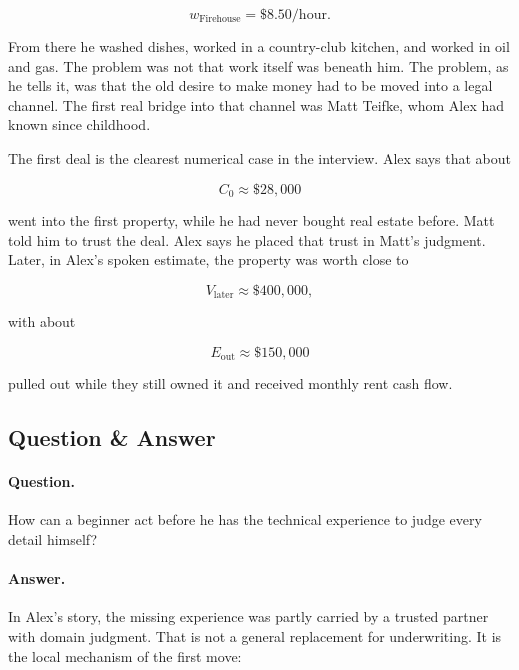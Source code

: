 \documentclass[11pt,oneside]{book}
\begin{document}
\begin{equation}
w_{\text{Firehouse}}=\$8.50/\text{hour}.
\end{equation}

From there he washed dishes, worked in a country-club kitchen, and worked in oil and gas. The problem was not that work itself was beneath him. The problem, as he tells it, was that the old desire to make money had to be moved into a legal channel. The first real bridge into that channel was Matt Teifke, whom Alex had known since childhood.

The first deal is the clearest numerical case in the interview. Alex says that about

\begin{equation}
C_0 \approx \$28{,}000
\end{equation}

went into the first property, while he had never bought real estate before. Matt told him to trust the deal. Alex says he placed that trust in Matt's judgment. Later, in Alex's spoken estimate, the property was worth close to

\begin{equation}
V_{\text{later}} \approx \$400{,}000,
\end{equation}

with about

\begin{equation}
E_{\text{out}} \approx \$150{,}000
\end{equation}

pulled out while they still owned it and received monthly rent cash flow.

\subsection{Question \& Answer}

\paragraph{Question.}
How can a beginner act before he has the technical experience to judge every detail himself?

\paragraph{Answer.}
In Alex's story, the missing experience was partly carried by a trusted partner with domain judgment. That is not a general replacement for underwriting. It is the local mechanism of the first move:
\end{document}
